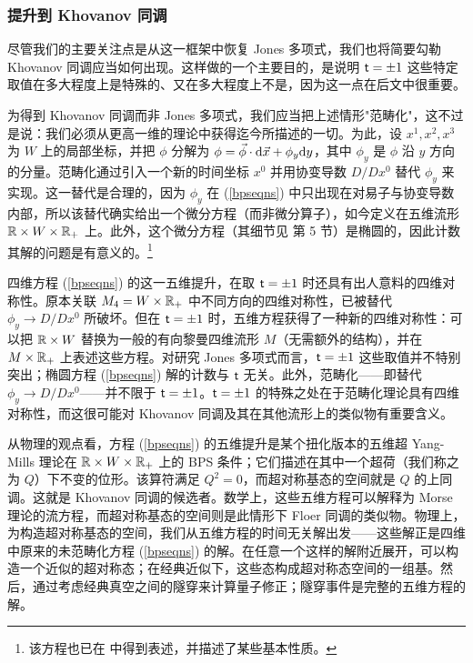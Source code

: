 \subsubsection{提升到 Khovanov 同调}\label{lift}

尽管我们的主要关注点是从这一框架中恢复 Jones 多项式，我们也将简要勾勒 Khovanov 同调应当如何出现。这样做的一个主要目的，是说明 ${ \sf t}=\pm 1$ 这些特定取值在多大程度上是特殊的、又在多大程度上不是，因为这一点在后文中很重要。

为得到 Khovanov 同调而非 Jones 多项式，我们应当把上述情形"范畴化"，这不过是说：我们必须从更高一维的理论中获得迄今所描述的一切。为此，设 $x^1,x^2,x^3$ 为 $W$ 上的局部坐标，并把 $\phi$ 分解为 $\phi =\vec\phi\cdot {\mathrm d}\vec x+\phi_y {\mathrm d} y$，其中 $\phi_y$ 是 $\phi$ 沿 $y$ 方向的分量。范畴化通过引入一个新的时间坐标 $x^0$ 并用协变导数 $D/D x^0$ 替代 $\phi_y$ 来实现。这一替代是合理的，因为 $\phi_y$ 在 (\ref{bpseqns}) 中只出现在对易子与协变导数内部，所以该替代确实给出一个微分方程（而非微分算子），如今定义在五维流形 ${\mathbb R}\times W\times {\mathbb R}_+$ 上。此外，这个微分方程（其细节见 \cite{fiveknots} 第 5 节）是椭圆的，因此计数其解的问题是有意义的。\footnote{该方程也已在 \cite{Haydys} 中得到表述，并描述了某些基本性质。}

四维方程 (\ref{bpseqns}) 的这一五维提升，在取 ${ \sf t}=\pm 1$ 时还具有出人意料的四维对称性。原本关联 $M_4=W\times{\mathbb R}_+$ 中不同方向的四维对称性，已被替代 $\phi_y\to D/D x^0$ 所破坏。但在 ${ \sf t}=\pm 1$ 时，五维方程获得了一种新的四维对称性：可以把 ${\mathbb R}\times W$ 替换为一般的有向黎曼四维流形 $M$（无需额外的结构），并在 $M\times {\mathbb R}_+$ 上表述这些方程。对研究 Jones 多项式而言，${ \sf t}=\pm 1$ 这些取值并不特别突出；椭圆方程 (\ref{bpseqns}) 解的计数与 ${ \sf t}$ 无关。此外，范畴化——即替代 $\phi_y\to D/D x^0$——并不限于 ${ \sf t}=\pm 1$。${ \sf t}=\pm 1$ 的特殊之处在于范畴化理论具有四维对称性，而这很可能对 Khovanov 同调及其在其他流形上的类似物有重要含义。

从物理的观点看，方程 (\ref{bpseqns}) 的五维提升是某个扭化版本的五维超 Yang-Mills 理论在 ${\mathbb R}\times W\times {\mathbb R}_+$ 上的 BPS 条件；它们描述在其中一个超荷（我们称之为 $Q$）下不变的位形。该算符满足 $Q^2=0$，而超对称基态的空间就是 $Q$ 的上同调。这就是 Khovanov 同调的候选者。数学上，这些五维方程可以解释为 Morse 理论的流方程，而超对称基态的空间则是此情形下 Floer 同调的类似物。物理上，为构造超对称基态的空间，我们从五维方程的时间无关解出发——这些解正是四维中原来的未范畴化方程 (\ref{bpseqns}) 的解。在任意一个这样的解附近展开，可以构造一个近似的超对称态；在经典近似下，这些态构成超对称态空间的一组基。然后，通过考虑经典真空之间的隧穿来计算量子修正；隧穿事件是完整的五维方程的解。

